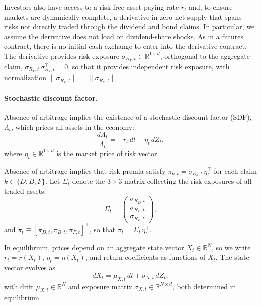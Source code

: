 \documentclass[12pt,english]{article}
\begin{document}
Investors also have access to a risk-free asset paying rate $r_t$ and, to ensure markets are dynamically complete, a derivative in zero net supply that spans risks not directly traded through the dividend and bond claims. 
In particular, we assume the derivative does not load on dividend-share shocks.
As in a futures contract, there is no initial cash exchange to enter into the derivative contract.
The derivative provides risk exposure $\sigma_{R_F,t} \in \mathbb{R}^{1\times d}$, orthogonal to the aggregate claim, $\sigma_{R_F,t}\,\sigma_{R_Y,t}^\top = 0$, so that it provides independent risk exposure, with normalization $\|\sigma_{R_F,t}\| = \|\sigma_{R_Y,t}\|$.

\paragraph{Stochastic discount factor.} Absence of arbitrage implies the existence of a stochastic discount factor (SDF), $\Lambda_t$, which prices all assets in the economy:
\begin{equation}
    \frac{d\Lambda_t}{\Lambda_t} = -r_t\,dt - \eta_t\,dZ_t,
\end{equation}
where $\eta_t \in \mathbb{R}^{1\times d}$ is the market price of risk vector. 

Absence of arbitrage implies that risk premia satisfy $\pi_{k,t} = \sigma_{R_k,t}\,\eta_t^\top$ for each claim $k \in \{D,B,F\}$.
Let $\Sigma_t$ denote the $3 \times 3$ matrix collecting the risk exposures of all traded assets:
\begin{equation}
    \Sigma_t = \begin{pmatrix}
        \sigma_{R_D,t} \\
        \sigma_{R_B,t} \\
        \sigma_{R_F,t}
    \end{pmatrix},
\end{equation}
and $\pi_t \equiv [\pi_{D,t}, \pi_{B,t}, \pi_{F,t}]^\top$, so that $\pi_t = \Sigma_t\,\eta_t^\top$.

In equilibrium, prices depend on an aggregate state vector $X_t \in \mathbb{R}^N$, so we write $r_t = r(X_t)$, $\eta_t = \eta(X_t)$, and return coefficients as functions of $X_t$.
The state vector evolves as
\begin{equation}\label{eq:state_dynamics}
    dX_t = \mu_{X,t}\,dt + \sigma_{X,t}\,dZ_t,
\end{equation}
with drift $\mu_{X,t} \in \mathbb{R}^N$ and exposure matrix $\sigma_{X,t} \in \mathbb{R}^{N\times d}$, both determined in equilibrium.
\end{document}
